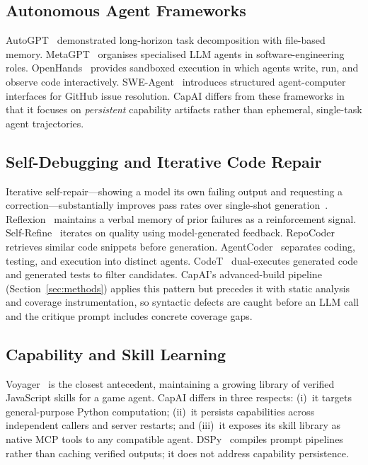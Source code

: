 \documentclass[conference]{IEEEtran}
\begin{document}
\subsection{Autonomous Agent Frameworks}

AutoGPT~\cite{autogpt2023} demonstrated long-horizon task decomposition
with file-based memory.
MetaGPT~\cite{hong2023metagpt} organises specialised LLM agents in
software-engineering roles.
OpenHands~\cite{wang2024openhands} provides sandboxed execution in which
agents write, run, and observe code interactively.
SWE-Agent~\cite{yang2024sweagent} introduces structured agent-computer
interfaces for GitHub issue resolution.
CapAI differs from these frameworks in that it focuses on
\emph{persistent} capability artifacts rather than ephemeral, single-task
agent trajectories.

\subsection{Self-Debugging and Iterative Code Repair}

Iterative self-repair---showing a model its own failing output and
requesting a correction---substantially improves pass rates over
single-shot generation~\cite{chen2023selfdebug}.
Reflexion~\cite{shinn2023reflexion} maintains a verbal memory of prior
failures as a reinforcement signal.
Self-Refine~\cite{madaan2023selfrefine} iterates on quality using
model-generated feedback.
RepoCoder~\cite{zhang2023repocoder} retrieves similar code snippets
before generation.
AgentCoder~\cite{huang2023agentcoder} separates coding, testing, and
execution into distinct agents.
CodeT~\cite{chen2022codet} dual-executes generated code and generated
tests to filter candidates.
CapAI's advanced-build pipeline (Section~\ref{sec:methods}) applies this
pattern but precedes it with static analysis and coverage instrumentation,
so syntactic defects are caught before an LLM call and the critique
prompt includes concrete coverage gaps.

\subsection{Capability and Skill Learning}

Voyager~\cite{wang2023voyager} is the closest antecedent, maintaining a
growing library of verified JavaScript skills for a game agent.
CapAI differs in three respects: (i)~it targets general-purpose Python
computation; (ii)~it persists capabilities across independent callers and
server restarts; and (iii)~it exposes its skill library as native MCP
tools to any compatible agent.
DSPy~\cite{khattab2023dspy} compiles prompt pipelines rather than caching
verified outputs; it does not address capability persistence.
\end{document}
